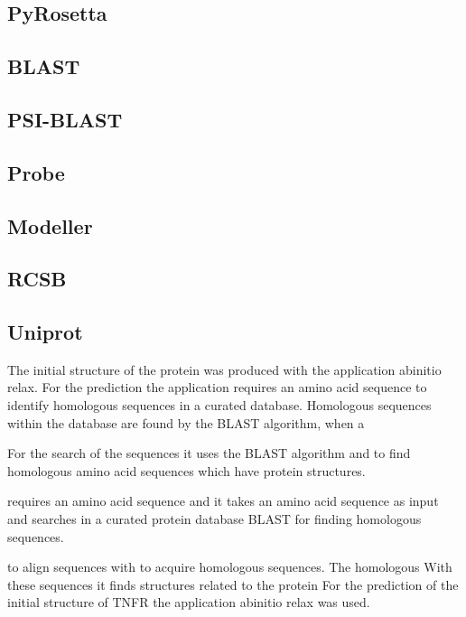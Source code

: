 \subsection{PyRosetta}
\label{subsec:MM_PyRosetta}

\subsection{BLAST}
\label{subsec:MM_BLAST}

\subsection{PSI-BLAST}
\label{subsec:MM_PSI_BLAST}

\subsection{Probe}
\label{subsec:MM_Probe}

\subsection{Modeller}
\label{subsec:MM_Modeller}

\subsection{RCSB}
\label{subsec:MM_RCSB}

\subsection{Uniprot}
\label{subsec:MM_Uniprot}




 The initial structure of the protein was produced with the application abinitio relax. For the prediction the application requires an amino acid sequence to identify homologous sequences in a curated database. Homologous sequences within the database are found by the BLAST algorithm, when a

For the search of the sequences it uses the BLAST algorithm and to find homologous amino acid sequences which have protein structures.

requires an amino acid sequence and  it takes an amino acid sequence as input and searches in a curated protein database BLAST for finding homologous sequences. 


to align sequences with to acquire homologous sequences.  The homologous With these sequences it finds structures related to the protein
For the prediction of the initial structure of TNFR the application abinitio relax was used. 

